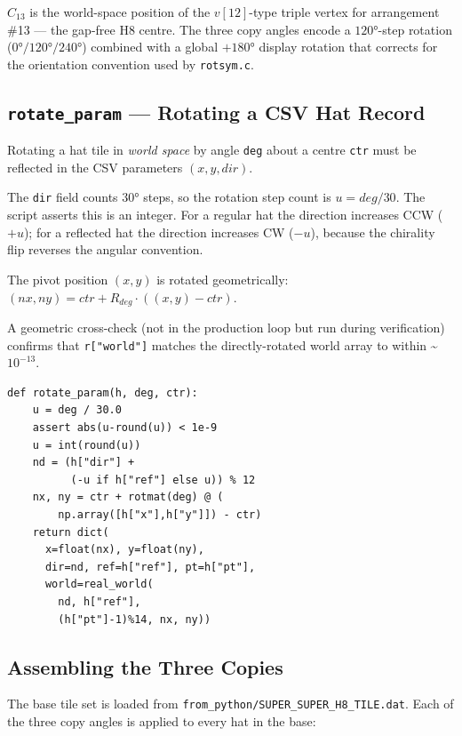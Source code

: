 \documentclass[10pt,a4paper]{article}
\let\polysubsection\subsection
\renewcommand\subsection{\needspace{0.12\textheight}\polysubsection}
\newcommand{\code}[1]{\texttt{\small #1}}
\newcommand{\file}[1]{\texttt{\footnotesize #1}}
\begin{document}
\noindent $C_{13}$ is the world-space position of the $v[12]$-type triple vertex
for arrangement \#13 — the gap-free H8 centre.  The three copy angles encode a
$120°$-step rotation ($0°/120°/240°$) combined with a global $+180°$ display
rotation that corrects for the orientation convention used by \code{rotsym.c}.

\subsection{\code{rotate\_param} — Rotating a CSV Hat Record}

\begin{tcolorbox}[dualbox, title={\code{rotate\_param(h, deg, ctr)} — rotate placement parameters}]
  Rotating a hat tile in \emph{world space} by angle \code{deg} about a
  centre \code{ctr} must be reflected in the CSV parameters $(x, y, \mathit{dir})$.

  The \code{dir} field counts $30°$ steps, so the rotation step count is
  $u = \mathit{deg}/30$.  The script asserts this is an integer.  For a
  regular hat the direction increases CCW ($+u$); for a reflected hat the
  direction increases CW ($-u$), because the chirality flip reverses the
  angular convention.

  The pivot position $(x, y)$ is rotated geometrically:
  $(nx, ny) = \mathit{ctr} + R_{\mathit{deg}}\cdot((x,y) - \mathit{ctr})$.

  A geometric cross-check (not in the production loop but run during
  verification) confirms that \code{r["world"]} matches the directly-rotated
  world array to within \textasciitilde$10^{-13}$.
\tcblower
\begin{verbatim}
def rotate_param(h, deg, ctr):
    u = deg / 30.0
    assert abs(u-round(u)) < 1e-9
    u = int(round(u))
    nd = (h["dir"] +
          (-u if h["ref"] else u)) % 12
    nx, ny = ctr + rotmat(deg) @ (
        np.array([h["x"],h["y"]]) - ctr)
    return dict(
      x=float(nx), y=float(ny),
      dir=nd, ref=h["ref"], pt=h["pt"],
      world=real_world(
        nd, h["ref"],
        (h["pt"]-1)%14, nx, ny))
\end{verbatim}
\end{tcolorbox}

\subsection{Assembling the Three Copies}

The base tile set is loaded from \file{from\_python/SUPER\_SUPER\_H8\_TILE.dat}.
Each of the three copy angles is applied to every hat in the base:
\end{document}
